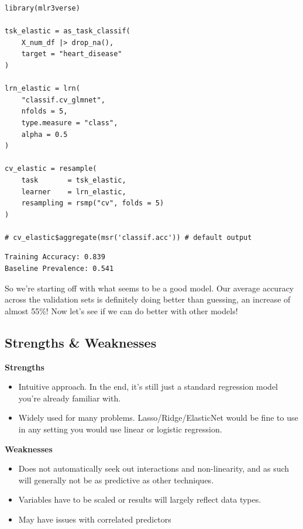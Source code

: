 \documentclass[
  letterpaper,
]{krantz}
\providecommand{\tightlist}{%
  \setlength{\itemsep}{0pt}\setlength{\parskip}{0pt}}\usepackage{longtable,booktabs,array}
\begin{document}
\begin{verbatim}
library(mlr3verse)

tsk_elastic = as_task_classif(
    X_num_df |> drop_na(),
    target = "heart_disease"
)

lrn_elastic = lrn(
    "classif.cv_glmnet", 
    nfolds = 5, 
    type.measure = "class", 
    alpha = 0.5
)

cv_elastic = resample(
    task       = tsk_elastic,
    learner    = lrn_elastic,
    resampling = rsmp("cv", folds = 5)
)

# cv_elastic$aggregate(msr('classif.acc')) # default output
\end{verbatim}

\begin{verbatim}
Training Accuracy: 0.839
Baseline Prevalence: 0.541
\end{verbatim}

So we're starting off with what seems to be a good model. Our average
accuracy across the validation sets is definitely doing better than
guessing, an increase of almost 55\%! Now let's see if we can do better
with other models!

\subsection{Strengths \& Weaknesses}\label{strengths-weaknesses}

\textbf{Strengths}

\begin{itemize}
\tightlist
\item
  Intuitive approach. In the end, it's still just a standard regression
  model you're already familiar with.
\item
  Widely used for many problems. Lasso/Ridge/ElasticNet would be fine to
  use in any setting you would use linear or logistic regression.
\end{itemize}

\textbf{Weaknesses}

\begin{itemize}
\tightlist
\item
  Does not automatically seek out interactions and non-linearity, and as
  such will generally not be as predictive as other techniques.
\item
  Variables have to be scaled or results will largely reflect data
  types.
\item
  May have issues with correlated predictors
\end{itemize}
\end{document}
